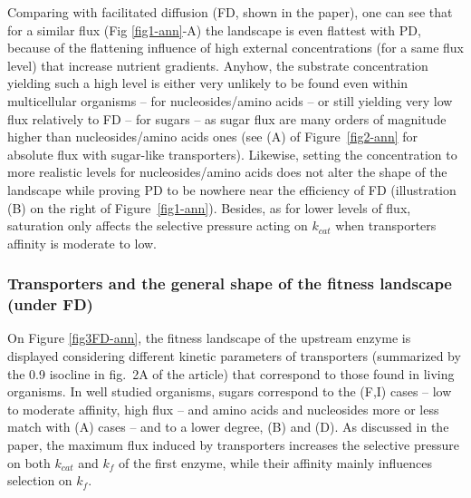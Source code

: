 Comparing with facilitated diffusion (FD, shown in the paper), one can see that for a similar flux (Fig \ref{fig1-ann}-A) the landscape is even flattest with PD, because of the flattening influence of high external concentrations (for a same flux level) that increase nutrient gradients. Anyhow, the substrate concentration yielding such a high level is either very unlikely to be found even within multicellular organisms -- for nucleosides/amino acids -- or still yielding very low flux relatively to FD -- for sugars -- as sugar flux are many orders of magnitude higher than nucleosides/amino acids ones (see (A) of Figure~\ref{fig2-ann} for absolute flux with sugar-like transporters). Likewise, setting the concentration to more realistic levels for nucleosides/amino acids does not alter the shape of the landscape while proving PD to be nowhere near the efficiency of FD (illustration (B) on the right of Figure~\ref{fig1-ann}). Besides, as for lower levels of flux, saturation only affects the selective pressure acting on $k_{cat}$ when transporters affinity is moderate to low.

\subsubsection{Transporters and the general shape of the fitness landscape (under FD) \label{sec:FP1}}

On Figure \ref{fig3FD-ann}, the fitness landscape of the upstream enzyme is displayed considering different kinetic parameters of transporters (summarized by the 0.9 isocline in fig.~2A of the article) that correspond to those found in living organisms. In well studied organisms, sugars correspond to the (F,I) cases -- low to moderate affinity, high flux -- and amino acids and nucleosides more or less match with (A) cases -- and to a lower degree, (B) and (D). As discussed in the paper, the maximum flux induced by transporters increases the selective pressure on both $k_{cat}$ and $k_f$ of the first enzyme, while their affinity mainly influences selection on $k_f$.

